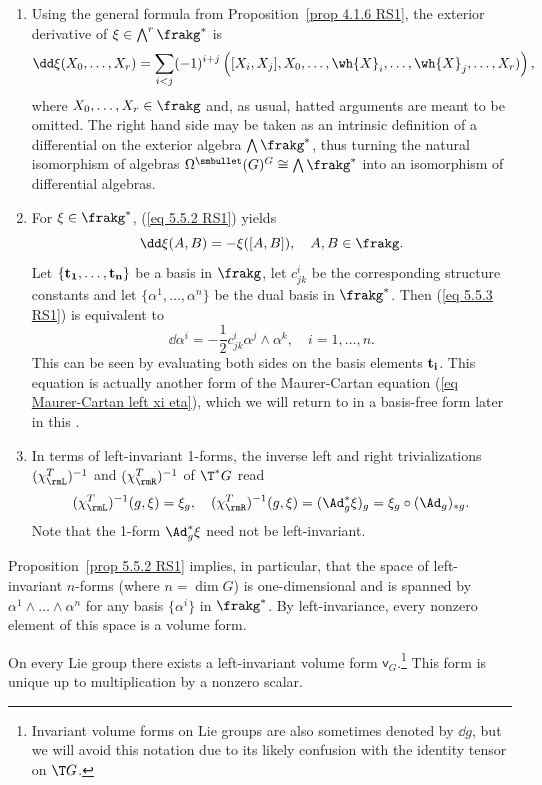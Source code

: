 \begin{rem}
\begin{enumerate}
    \item Using the general formula from Proposition~\ref{prop 4.1.6 RS1}, the exterior derivative of $\xi\in\bigwedge^r\frakg^\ast$ is
    \[\dd\xi(X_0,\ldots,X_r)=\sum_{i<j}(-1)^{i+j}\left([X_i,X_j],X_0,\ldots,\wh{X}_i,\ldots,\wh{X}_j,\ldots,X_r)\right),\label{eq 5.5.2 RS1}\]
    where $X_0,\ldots,X_r\in\frakg$ and, as usual, hatted arguments are meant to be omitted. The right hand side may be taken as an intrinsic definition of a differential on the exterior algebra $\bigwedge\frakg^\ast$, thus turning the natural isomorphism of algebras $\Omega^{\smbullet }(G)^G\cong\bigwedge\frakg^\ast$ into an isomorphism of differential algebras.
    \item For $\xi\in\frakg^\ast$, (\ref{eq 5.5.2 RS1}) yields
    \[\dd\xi(A,B)=-\xi([A,B]),\quad A,B\in\frakg.\label{eq 5.5.3 RS1}\]
    Let $\{\bf{t}_1,\ldots,\bf{t}_n\}$ be a basis in $\frakg$, let $c^i_{jk}$  be the corresponding structure constants and let $\{\alpha^1,\ldots,\alpha^n\}$ be the dual basis in $\frakg^\ast$. Then (\ref{eq 5.5.3 RS1}) is equivalent to
    \[\dd \alpha^i=-\frac 12 c^i_{jk}\alpha^j\wedge \alpha^k,\quad i=1,\ldots,n.\label{eq 5.5.4 RS1 MC in coords}\]
    This can be seen by evaluating both sides on the basis elements $\bf{t}_i$. This equation is actually another form of the Maurer-Cartan equation  (\ref{eq Maurer-Cartan left xi eta}), which we will return to in a basis-free form later in this \sect.
    \item In terms of left-invariant 1-forms, the inverse left and right trivializations $(\chi_\rmL^T)^{-1}$ and $(\chi_\rmR^T)^{-1}$ of $\T^\ast G$ read
    \[(\chi_\rmL^T)^{-1}(g,\xi)=\xi_g,\quad (\chi_\rmR^T)^{-1}(g,\xi)=(\Ad_{g}^\ast \xi)_g=\xi_g\circ (\Ad_g)_{\ast g}.\]
    Note that the 1-form $\Ad_g^\ast\xi$ need not be left-invariant.
\end{enumerate}
\end{rem}

Proposition~\ref{prop 5.5.2 RS1} implies, in particular, that the space of left-invariant $n$-forms (where $n=\dim G$) is one-dimensional and is spanned by $\alpha^1\wedge\ldots\wedge\alpha^n$ for any basis $\{\alpha^i\}$ in $\frakg^\ast$. By left-invariance, every nonzero element of this space is a volume form.

\begin{cor}
    On every Lie group there exists a left-invariant volume form $\mathsf{v}_G$.\footnote{Invariant volume forms on Lie groups are also sometimes denoted by $\dd g$, but we will avoid this notation due to its likely confusion with the identity tensor on $\T G$.} This form is unique up to multiplication by a nonzero scalar. 
\end{cor}

